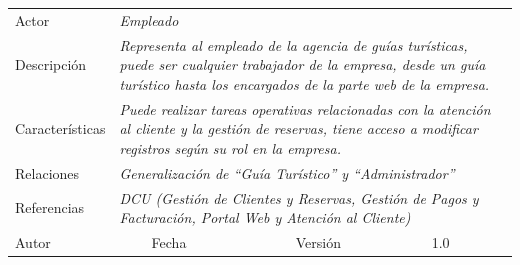 \newpage


\begin{table}[H]
    \begin{tabular}{llllllll}
    \cline{1-7}
    \multicolumn{1}{|l|}{Actor}           & \multicolumn{4}{l|}{{\color[HTML]{A6A6A6} \textit{Empleado}}}                                                               & \multicolumn{2}{l|}{\cellcolor[HTML]{E6E6E6}{\color[HTML]{A6A6A6} \textit{AC-3}}}                         &  \\ \cline{1-7}
    \multicolumn{1}{|l|}{Descripción}     & \multicolumn{6}{p{12cm}|}{{\color[HTML]{A6A6A6} \textit{Representa al empleado de la agencia de guías turísticas, puede ser cualquier trabajador de la empresa, desde un guía turístico hasta los encargados de la parte web de la empresa.}}}     &  \\ \cline{1-7}
    \multicolumn{1}{|l|}{Características} & \multicolumn{6}{p{12cm}|}{{\color[HTML]{A6A6A6} \textit{Puede realizar tareas operativas relacionadas con la atención al cliente y la gestión de reservas, tiene acceso a modificar registros según su rol en la empresa.}}} &  \\ \cline{1-7}
    \multicolumn{1}{|l|}{Relaciones}      & \multicolumn{6}{p{12cm}|}{{\color[HTML]{A6A6A6} \textit{Generalización de “Guía Turístico” y “Administrador”}}}                                                                                                                                                               &  \\ \cline{1-7}
    \multicolumn{1}{|l|}{Referencias}     & \multicolumn{6}{p{10cm}|}{{\color[HTML]{A6A6A6} \textit{DCU (Gestión de Clientes y Reservas, Gestión de Pagos y Facturación, Portal Web y Atención al Cliente)}}}                                                                                                                                                         &  \\ \cline{1-7}
    \multicolumn{1}{|l|}{Autor}           & \multicolumn{1}{l|}{}              & \multicolumn{1}{l|}{Fecha}              & \multicolumn{1}{l|}{}              & \multicolumn{2}{l|}{Versión}                            & \multicolumn{1}{l|}{1.0}                                        &  \\ \cline{1-7}
    \end{tabular}
\end{table}

